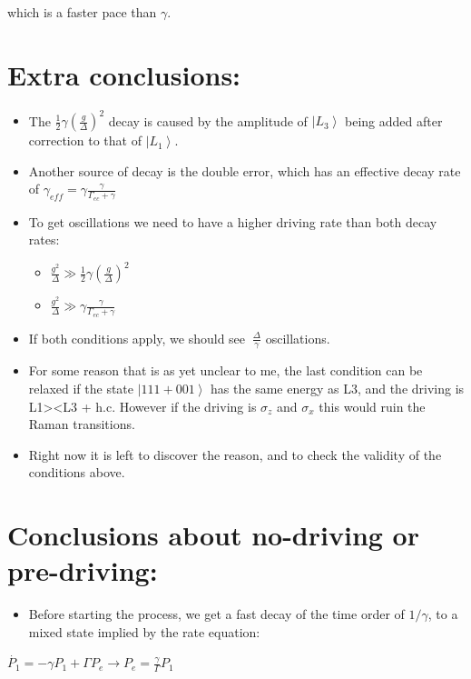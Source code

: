 \documentclass[letterpaper,10pt,english]{/usr/share/sphinx/texinputs/sphinxhowto}
\begin{document}
which is a faster pace than $\gamma$.\section{Extra conclusions:}\begin{itemize}
\item
  The $\frac{1}{2}\gamma\left(\frac{g}{\Delta}\right)^2$ decay is caused
  by the amplitude of $\left|L_3\right>$ being added after correction to
  that of $\left|L_1\right>$.
\item
  Another source of decay is the double error, which has an effective
  decay rate of $\gamma_{eff}=\gamma\frac{\gamma}{\Gamma_{ec}+\gamma}$
\item
  To get oscillations we need to have a higher driving rate than both
  decay rates:

  \begin{itemize}
  \item
    $\frac{g^2}{\Delta}\gg\frac{1}{2}\gamma\left(\frac{g}{\Delta}\right)^2$
  \item
    $\frac{g^2}{\Delta}\gg\gamma\frac{\gamma}{\Gamma_{ec}+\gamma}$
  \end{itemize}
\item
  If both conditions apply, we should see $~\frac{\Delta}{\gamma}$
  oscillations.
\item
  For some reason that is as yet unclear to me, the last condition can
  be relaxed if the state $\left|111+001\right>$ has the same energy as
  L3, and the driving is
  \textbar{}L1\textgreater{}\textless{}L3\textbar{} + h.c. However if
  the driving is $\sigma_z$ and $\sigma_x$ this would ruin the Raman
  transitions.
\item
  Right now it is left to discover the reason, and to check the validity
  of the conditions above.
\end{itemize}\section{Conclusions about no-driving or pre-driving:}\begin{itemize}
\itemsep1pt\parskip0pt
\item
  Before starting the process, we get a fast decay of the time order of
  $1/\gamma$, to a mixed state implied by the rate equation:
\end{itemize}

$\dot{P_{1}}  =  -\gamma P_{1}+\Gamma P_{e}\rightarrow P_{e}=\frac{\gamma}{\Gamma}P_{1}$
\end{document}
